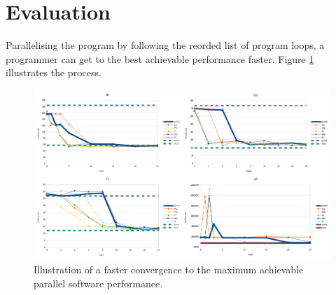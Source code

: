 \documentclass{acaces}
\begin{document}
\section{Evaluation}
\label{evaluation}
\quad Parallelising the program by following the reorded list of program loops, a programmer can get to the best achievable performance faster. Figure \ref{convergence} illustrates the process.   
\begin{figure}
	\centering
	\includegraphics[width=1.0\textwidth]{parallelisation_acceleration}
	\caption{Illustration of a faster convergence to the maximum achievable parallel software performance.}
	\label{convergence}
\end{figure}


\end{document}

